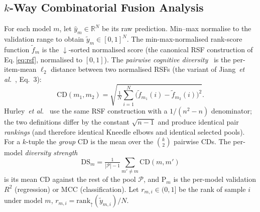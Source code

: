 \documentclass[conference]{IEEEtran}
\begin{document}
\subsection{$k$-Way Combinatorial Fusion Analysis}
\label{sec:cfa_math}
For each model $m$, let $\hat y_{m}\!\in\!\mathbb{R}^{N}$ be its raw
prediction. Min--max normalise to the validation range to obtain
$\tilde y_{m}\!\in\![0,1]^{N}$. The min-max-normalised rank-score function
$\tilde f_{m}$ is the $\downarrow$-sorted normalised score (the canonical
RSF construction of Eq.\,\ref{eq:rsf}, normalised to $[0,1]$). The
\emph{pairwise cognitive diversity}~\cite{Hsu2019CD} is the per-item-mean
$\ell_{2}$ distance between two normalised RSFs (the variant of
Jiang~\textit{et al.}~\cite{Jiang2023ADMET}, Eq.~3):
\begin{equation}
  \mathrm{CD}(m_{1},m_{2}) =
    \sqrt{\tfrac{1}{N}\textstyle\sum_{i=1}^{N}
     \bigl(\tilde f_{m_{1}}(i)-\tilde f_{m_{2}}(i)\bigr)^{2}}.
  \label{eq:cd}
\end{equation}
Hurley~\textit{et al.}~\cite[Eq.~14]{Hurley2021} use the same RSF
construction with a $1/(n^{2}-n)$ denominator; the two definitions differ
by the constant $\sqrt{n-1}$ and produce identical pair \emph{rankings} (and
therefore identical Kneedle elbows and identical selected pools).
For a $k$-tuple the \emph{group} CD is the mean over the $\binom{k}{2}$
pairwise CDs. The per-model \emph{diversity strength}
\begin{equation}
  \mathrm{DS}_{m} = \tfrac{1}{|\mathcal{P}|-1}\textstyle\sum_{m'\neq m}\mathrm{CD}(m,m')
  \label{eq:ds}
\end{equation}
is its mean CD against the rest of the pool $\mathcal{P}$, and
$\mathrm{P}_m$ is the per-model validation $R^{2}$ (regression) or MCC
(classification). Let $r_{m,i}\!\in\!(0,1]$ be the rank of sample $i$ under
model $m$, $r_{m,i}\!=\!\mathrm{rank}_\uparrow(\tilde y_{m,i})\!/\!N$.
\end{document}
